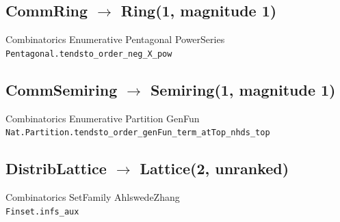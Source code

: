 \documentclass[10pt,a4paper]{article}
\begin{document}
\subsection*{CommRing $\to$ Ring\quad\textmd{\small (1, magnitude 1)}}
{\footnotesize\color{locator}Combinatorics\,\textperiodcentered\,Enumerative\,\textperiodcentered\,Pentagonal\,\textperiodcentered\,PowerSeries}\\
\hspace*{1em}\texttt{\small Pentagonal.\allowbreak{}tendsto\_order\_neg\_X\_pow}\\
\hspace*{2em}{\footnotesize\itshape signature not resolved}

\subsection*{CommSemiring $\to$ Semiring\quad\textmd{\small (1, magnitude 1)}}
{\footnotesize\color{locator}Combinatorics\,\textperiodcentered\,Enumerative\,\textperiodcentered\,Partition\,\textperiodcentered\,GenFun}\\
\hspace*{1em}\texttt{\small Nat.\allowbreak{}Partition.\allowbreak{}tendsto\_order\_genFun\_term\_atTop\_nhds\_top}\;{\footnotesize$\ddagger$}\\

\subsection*{DistribLattice $\to$ Lattice\quad\textmd{\small (2, unranked)}}
{\footnotesize\color{locator}Combinatorics\,\textperiodcentered\,SetFamily\,\textperiodcentered\,AhlswedeZhang}\\
\hspace*{1em}\texttt{\small Finset.\allowbreak{}infs\_aux}\\
\hspace*{2em}{\footnotesize\itshape signature not resolved}
\end{document}
